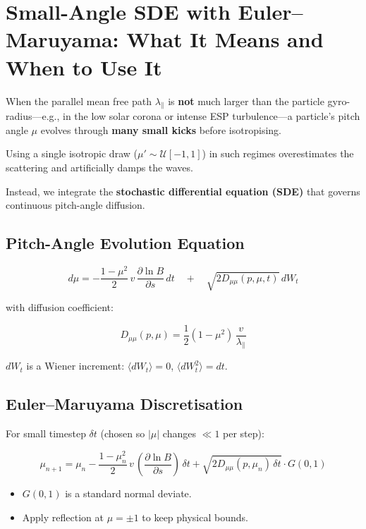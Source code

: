 {\section*{Small-Angle SDE with Euler–Maruyama: What It Means and When to Use It}

When the parallel mean free path $\lambda_\parallel$ is \textbf{not} much larger than the particle gyro-radius—e.g., in the low solar corona or intense ESP turbulence—a particle's pitch angle $\mu$ evolves through \textbf{many small kicks} before isotropising.

Using a single isotropic draw ($\mu' \sim \mathcal{U}[-1,1]$) in such regimes overestimates the scattering and artificially damps the waves.

Instead, we integrate the \textbf{stochastic differential equation (SDE)} that governs continuous pitch-angle diffusion.

\subsection*{Pitch-Angle Evolution Equation}

\begin{tcolorbox}
\[
d\mu = -\frac{1 - \mu^2}{2} \, v \, \frac{\partial \ln B}{\partial s} \, dt
\quad+\quad
\sqrt{2 D_{\mu\mu}(p,\mu,t)} \, dW_t
\tag{1}
\]
\end{tcolorbox}

\noindent
with diffusion coefficient:
\begin{tcolorbox}
\[
D_{\mu\mu}(p,\mu)
= \frac{1}{2}(1 - \mu^2)\,\frac{v}{\lambda_\parallel}
\tag{2}
\]
\end{tcolorbox}

\noindent
$dW_t$ is a Wiener increment: $\langle dW_t \rangle = 0$, $\langle dW_t^2 \rangle = dt$.

\subsection*{Euler–Maruyama Discretisation}

For small timestep $\delta t$ (chosen so $|\mu|$ changes $\ll 1$ per step):

\begin{tcolorbox}
\[
\mu_{n+1}
= \mu_n
- \frac{1 - \mu_n^2}{2}\,v\,\left( \frac{\partial \ln B}{\partial s} \right)\, \delta t
+ \sqrt{2 D_{\mu\mu}(p, \mu_n)\, \delta t} \cdot G(0,1)
\tag{3}
\]
\end{tcolorbox}

\begin{itemize}
  \item $G(0,1)$ is a standard normal deviate.
  \item Apply reflection at $\mu = \pm1$ to keep physical bounds.
\end{itemize}

}
